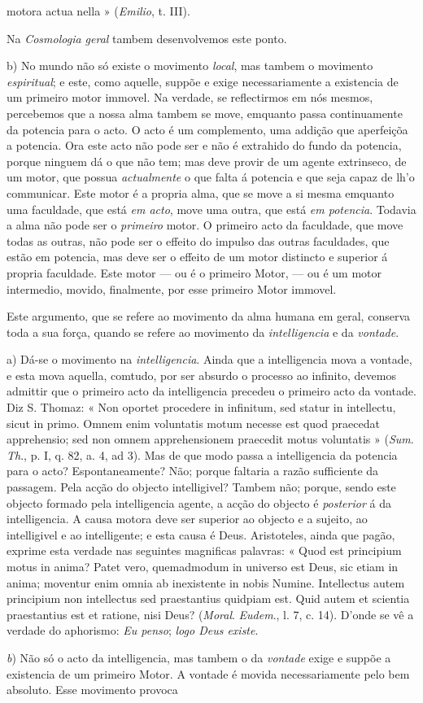 motora actua nella » (\emph{Emilio}, t. III).\par Na \emph{Cosmologia geral} tambem desenvolvemos este ponto.\par b) No mundo não só existe o movimento \emph{local}, mas tambem o movimento \emph{espiritual}; e este, como aquelle, suppõe e exige necessariamente a existencia de um primeiro motor immovel. Na verdade, se reflectirmos em nós mesmos, percebemos que a nossa alma tambem se move, emquanto passa continuamente da potencia para o acto. O acto é um complemento, uma addição que aperfeiçõa a potencia. Ora este acto não pode ser e não é extrahido do fundo da potencia, porque ninguem dá o que não tem; mas deve provir de um agente extrinseco, de um motor, que possua \emph{actualmente} o que falta á potencia e que seja capaz de lh'o communicar. Este motor é a propria alma, que se move a si mesma emquanto uma faculdade, que está \emph{em acto}, move uma outra, que está \emph{em potencia}. Todavia a alma não pode ser o \emph{primeiro} motor. O primeiro acto da faculdade, que move todas as outras, não pode ser o effeito do impulso das outras faculdades, que estão em potencia, mas deve ser o effeito de um motor distincto e superior á propria faculdade. Este motor --- ou é o primeiro Motor, --- ou é um motor intermedio, movido, finalmente, por esse primeiro Motor immovel.\par Este argumento, que se refere ao movimento da alma humana em geral, conserva toda a sua força, quando se refere ao movimento da \emph{intelligencia} e da \emph{vontade}.\par a) Dá-se o movimento na \emph{intelligencia}. Ainda que a intelligencia mova a vontade, e esta mova aquella, comtudo, por ser absurdo o processo ao infinito, devemos admittir que o primeiro acto da intelligencia precedeu o primeiro acto da vontade. Diz S. Thomaz: « Non oportet procedere in infinitum, sed statur in intellectu, sicut in primo. Omnem enim voluntatis motum necesse est quod praecedat apprehensio; sed non omnem apprehensionem praecedit motus voluntatis » (\emph{Sum}. \emph{Th}., p. I, q. 82, a. 4, ad 3). Mas de que modo passa a intelligencia da potencia para o acto? Espontaneamente? Não; porque faltaria a razão sufficiente da passagem. Pela acção do objecto intelligivel? Tambem não; porque, sendo este objecto formado pela intelligencia agente, a acção do objecto é \emph{posterior} á da intelligencia. A causa motora deve ser superior ao objecto e a sujeito, ao intelligivel e ao intelligente; e esta causa é Deus. Aristoteles, ainda que pagão, exprime esta verdade nas seguintes magnificas palavras: « Quod est principium motus in anima? Patet vero, quemadmodum in universo est Deus, sic etiam in anima; moventur enim omnia ab inexistente in nobis Numine. Intellectus autem principium non intellectus sed praestantius quidpiam est. Quid autem et scientia praestantius est et ratione, nisi Deus? (\emph{Moral}. \emph{Eudem}., l. 7, c. 14). D'onde se vê a verdade do aphorismo: \emph{Eu penso}; \emph{logo Deus existe}.\par \emph{b}) Não só o acto da intelligencia, mas tambem o da \emph{vontade} exige e suppõe a existencia de um primeiro Motor. A vontade é movida necessariamente pelo bem absoluto. Esse movimento provoca 